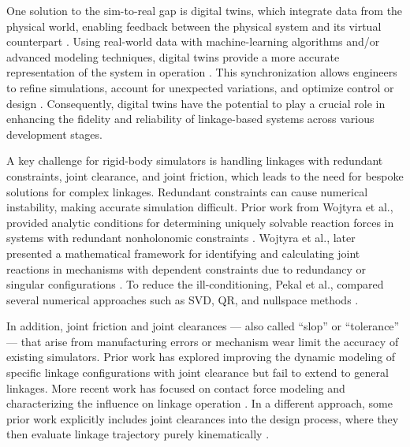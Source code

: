 One solution to the sim-to-real gap is digital twins, which integrate data from the physical world, enabling feedback between the physical system and its virtual counterpart \cite{tao_digital_2019}. Using real-world data with machine-learning algorithms and/or advanced modeling techniques, digital twins provide a more accurate representation of the system in operation \cite{phanden_review_2021}. This synchronization allows engineers to refine simulations, account for unexpected variations, and optimize control or design \cite{ritto_digital_2021, kapteyn_data-driven_2022}. Consequently, digital twins have the potential to play a crucial role in enhancing the fidelity and reliability of linkage-based systems across various development stages.

A key challenge for rigid-body simulators is handling linkages with redundant constraints, joint clearance, and joint friction, which leads to the need for bespoke solutions for complex linkages. Redundant constraints can cause numerical instability, making accurate simulation difficult. Prior work from Wojtyra et al.,  provided analytic conditions for determining uniquely solvable reaction forces in systems with redundant nonholonomic constraints \cite{wojtyra_joint_2009}. Wojtyra et al., later presented a mathematical framework for identifying and calculating joint reactions in mechanisms with dependent constraints due to redundancy or singular configurations \cite{wojtyra_solvability_2013}. To reduce the ill-conditioning, Pekal et al., compared several numerical approaches such as SVD, QR, and nullspace methods \cite{pekal_constraint-matrix-based_2023}. 

In addition, joint friction and joint clearances --- also called ``slop'' or ``tolerance'' --- that arise from manufacturing errors or mechanism wear limit the accuracy of existing simulators. Prior work has explored improving the dynamic modeling of specific linkage configurations with joint clearance \cite{funabashi_dynamic_1978, soong_theoretical_1990} but fail to extend to general linkages.  More recent work has focused on contact force modeling and characterizing the influence on linkage operation \cite{akhadkar_influence_2014, tan_continuous_2017}. In a different approach, some prior work explicitly includes joint clearances into the design process, where they then evaluate linkage trajectory purely kinematically  \cite{mutawe_designing_2012, qi_synthesis_2023}.

